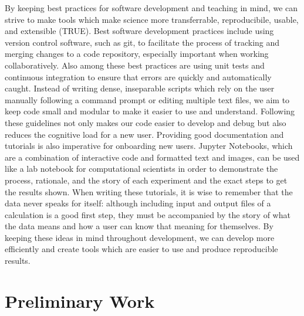 By keeping best practices for software development and teaching in mind, we can strive to make tools which make science more transferrable, reproducibile, usable, and extensible (TRUE)\cite{Thompson2020}.
Best software development practices include using version control software, such as git, to facilitate the process of tracking and merging changes to a code repository, especially important when working collaboratively.
Also among these best practices are using unit tests and continuous integration to ensure that errors are quickly and automatically caught\cite{Wilson2014}.
Instead of writing dense, inseparable scripts which rely on the user manually following a command prompt or editing multiple text files, we aim to keep code small and modular to make it easier to use and understand\cite{Adorf2018a}.
Following these guidelines not only makes our code easier to develop and debug but also reduces the cognitive load for a new user\cite{Jankowski2019}.
Providing good documentation and tutorials is also imperative for onboarding new users.
Jupyter Notebooks, which are a combination of interactive code and formatted text and images, can be used like a lab notebook for computational scientists in order to demonstrate the process, rationale, and the story of each experiment and the exact steps to get the results shown\cite{jupyter, Rule2019a}.
When writing these tutorials, it is wise to remember that the data never speaks for itself: although including input and output files of a calculation is a good first step, they must be accompanied by the story of what the data means and how a user can know that meaning for themselves\cite{SWC, Wilson2016}.
By keeping these ideas in mind throughout development, we can develop more efficiently and create tools which are easier to use and produce reproducible results.

\section*{Preliminary Work}

